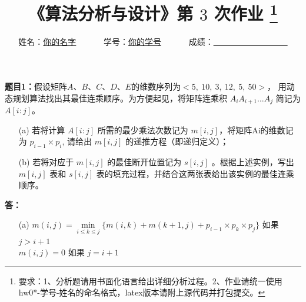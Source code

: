 \documentclass[12pt,a4paper]{article}
\begin{document}
\begin{CJK}{UTF8}{song}

\title{
  {\heiti《算法分析与设计》第 {$3$} 次作业
    \footnote{要求：1、分析题请用书面化语言给出详细分析过程。2、作业请统一使用hw0*-学号-姓名的命名格式，latex版本请附上源代码并打包提交。}
    }
}
\date{}

\author{
姓名：\underline{你的名字}~~~~~~
学号：\underline{你的学号}~~~~~~
成绩：\underline{~~~~~~~~~~~~~~~~~~}
}

\maketitle

\noindent
\section*{\bf \color{red}{算法分析题}}
\noindent
{\bf 题目1：}假设矩阵$A$、$B$、$C$、$D$、$E$的维数序列为$ <5,\ 10,\ 3,\ 12,\ 5,\ 50>$， 用动态规划算法找出其最佳连乘顺序。为方便起见，将矩阵连乘积 $A_iA_{i+1}...A_j$ 简记为 $A[i:j]$。
\begin{enumerate}
	\item[(a)]  若将计算 $A[i:j]$ 所需的最少乘法次数记为 $m[i,j]$，将矩阵Ai的维数记为 $p_{i-1}\times p_i$, 请给出 $m[i,j]$ 的递推方程（即递归定义）；
	\item[(b)]  若将对应于 $m[i,j]$ 的最佳断开位置记为 $s[i,j]$ 。根据上述实例，写出 $m[i,j]$ 表和 $s[i,j]$ 表的填充过程，并结合这两张表给出该实例的最佳连乘顺序。
\end{enumerate}

\vspace{5pt}
\noindent
{\bf 答：}
\begin{enumerate}
	\item[(a)]  $m(i, j) =  \min \limits_{i\le k \le j} \{ m(i, k) + m(k+1, j) + p_{i-1}\times p_k \times p_j \}$ \hspace{1cm}如果 $j > i + 1$\\
	$m(i, j) = 0$ \hspace{8.8cm}如果 $j = i +1$
	

\end{enumerate}
\end{CJK}
\end{document}
